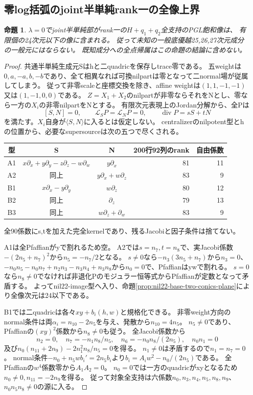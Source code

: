\documentclass[a4paper,11pt]{ltjsarticle}
\newtheorem{proposition}{命題}[section]
\theoremstyle{definition}
\begin{document}
\subsection{零log括弧のjoint半単純rank一の全像上界}
\begin{proposition}\label{prop:two-quadrics-zero-lambda-rank1-bound}
$\lambda=0$でjoint半単純部がrank一の$H+q_1+q_2$全支持のPGL飽和像は、
有限個の24次元以下の像に含まれる。
従って未知の一般底優越25,26,27次元成分の一般元にはならない。
既知成分への全点帰属はこの命題の結論に含めない。
\end{proposition}
\begin{proof}
共通半単純生成元Sはhと二quadricを保存しtrace零である。
五weightは$0,a,-a,b,-b$であり、全て相異なれば可換nilpartは零となって二normal場が従属してしまう。
従って非零scaleと座標交換を除き、affine weightは$(1,1,-1,-1)$又は$(1,-1,0,0)$である。
$Z=X_1+X_2$のnilpartが非零ならそれをNとし、零なら一方の$X_i$の非零nilpartをNとする。
有限次元表現上のJordan分解から、全Pは
\[
 [S,N]=0,\qquad\mathcal L_SP=\mathcal L_NP=0,
 \qquad\operatorname{div}P=sS+tN
\]
を満たす。$X_i$自身が$\langle S,N\rangle$に入るとは仮定しない。
centralizerのnilpotent型とhの位置から、必要なsupersourceは次の五つで尽くされる。
\begin{center}\small
\begin{tabular}{c|c|c|r|r}
型&S&N&200行92列のrank&自由係数\\\hline
A1&$x\partial_x+y\partial_y-z\partial_z-w\partial_w$&$y\partial_x$&81&11\\
A2&同上&$y\partial_x+w\partial_z$&83&9\\
B1&$x\partial_x-y\partial_y$&$w\partial_z$&80&12\\
B2&同上&$\partial_z$&79&13\\
B3&同上&$w\partial_z+\partial_w$&83&9
\end{tabular}
\end{center}
全90係数にs,tを加えた完全kernelであり、残るJacobiと因子条件は捨てない。

A1は全Pfaffianがyで割れるため空。
A2では$s=n_7,t=n_8$で、実Jacobi係数$-(2n_5+n_7)^2$から$n_5=-n_7/2$となる。
$s\ne0$なら$-n_3(3n_5+n_7)$から$n_3=0$、
$-n_0n_5-n_0n_7+n_2n_3-n_3n_4+n_3n_8$から$n_0=0$で、Pfaffianはywで割れる。
$s=0$なら$n_8\ne0$でなければ非退化Pのモジュラー恒等式からPfaffianが定数となって矛盾する。
よってnil22-image型へ入り、命題\ref{prop:nil22-base-two-conics-plane}により全像次元は24以下である。

B1では二quadricは各々$xy+b_i(h,w)$と規格化できる。
非零weight方向のnormal条件は両$\alpha_i=n_{10}-2n_5$を与え、発散から$n_{10}=4n_5$。
$n_5\ne0$であり、Pfaffianの$(xy)^2$係数から$n_8\ne0$も従う。
全Jacobi係数から
\[
 n_2=0,\quad n_7=-n_1n_8/n_5,\quad
 n_6=-n_0n_8/(2n_5),\quad n_0n_1=0
\]
及び$n_0(n_{11}+2n_9)-2n_1^2n_8/n_5=0$を得る。
$n_1\ne0$は矛盾するので$n_1=n_7=0$。
normal条件$-n_0+n_5wb_i'=2n_5b_i$より$b_i=A_iw^2-n_0/(2n_5)$である。
全Pfaffianの$w^4$係数零から$A_1A_2=0$。
$n_0=0$では一方のquadricがxyとなるため$n_0\ne0,n_{11}=-2n_9$を得る。
従って対象全支持は六係数$n_0,n_3,n_4,n_5,n_8,n_9$、$n_0n_5n_8\ne0$の源に入る。


\end{proof}
\end{document}
